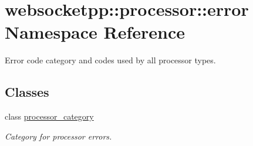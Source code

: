 \hypertarget{namespacewebsocketpp_1_1processor_1_1error}{}\section{websocketpp\+:\+:processor\+:\+:error Namespace Reference}
\label{namespacewebsocketpp_1_1processor_1_1error}


Error code category and codes used by all processor types.  


\subsection*{Classes}
\begin{DoxyCompactItemize}
\item 
class \hyperlink{classwebsocketpp_1_1processor_1_1error_1_1processor__category}{processor\+\_\+category}
\begin{DoxyCompactList}\small\item\em Category for processor errors. \end{DoxyCompactList}\end{DoxyCompactItemize}
